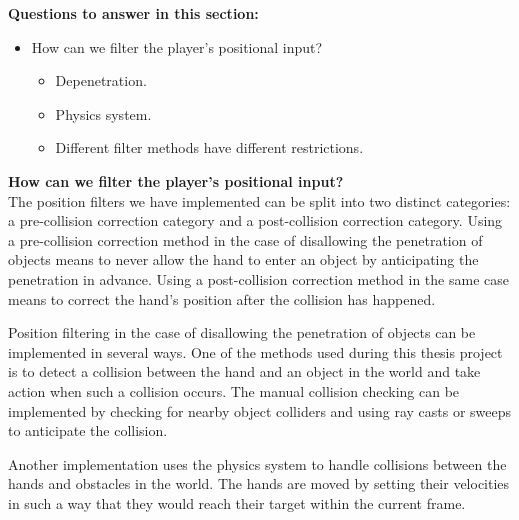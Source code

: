 
\textbf{Questions to answer in this section:}
\begin{itemize}
\item How can we filter the player's positional input?
\begin{itemize}
\item Depenetration.
\item Physics system.
\item Different filter methods have different restrictions.
\end{itemize}
\end{itemize}

\textbf{How can we filter the player's positional input?}\\
The position filters we have implemented can be split into two distinct categories: a pre-collision correction category and a post-collision correction category. Using a pre-collision correction method in the case of disallowing the penetration of objects means to never allow the hand to enter an object by anticipating the penetration in advance. Using a post-collision correction method in the same case means to correct the hand's position after the collision has happened.





Position filtering in the case of disallowing the penetration of objects can be implemented in several ways. One of the methods used during this thesis project is to detect a collision between the hand and an object in the world and take action when such a collision occurs. The manual collision checking can be implemented by checking for nearby object colliders and using ray casts or sweeps to anticipate the collision.

Another implementation uses the physics system to handle collisions between the hands and obstacles in the world. The hands are moved by setting their velocities in such a way that they would reach their target within the current frame.

